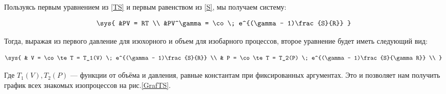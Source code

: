 \documentclass[12pt]{kiarticle}
\begin{document}
Пользуясь первым уравнением из \eqref{TS} и первым равенством из \eqref{S}, мы получаем систему:

\begin{equation}\label{sysTS}
\sys{
&PV = RT \\
&PV^\gamma = \co \; e^{(\gamma - 1)\frac{S}{R}}
}
\end{equation}

Тогда, выражая из первого давление для изохорного и объем для изобарного процессов, второе уравнение будет иметь следующий вид:

\begin{equation}\label{}
\sys{
& V = \co \te T = T_1(V) \; e^{(\gamma - 1)\frac{S}{R}} \\
& P = \co \te T = T_2(P) \; e^{(\gamma - 1)\frac{S}{\gamma R}} \\
}
\end{equation}

Где $ T_1(V), T_2(P) $ --- функции от объёма и давления, равные константам при фиксированных аргументах. Это и позволяет нам получить график всех знакомых изопроцессов на рис.\ref{GrafTS}. 




\end{document}
